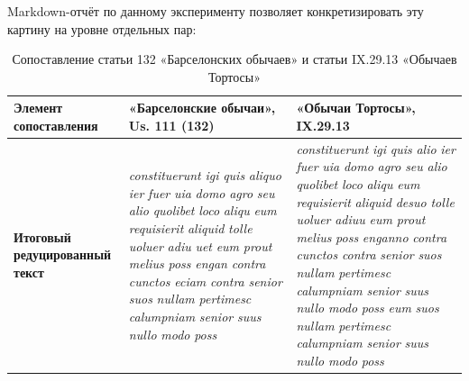Markdown-отчёт по данному эксперименту позволяет конкретизировать эту картину на уровне отдельных пар:

\begin{center}
\small
\setlength{\tabcolsep}{2pt}
\begin{longtable}{|p{}|p{}|p{}|}
\caption{Сопоставление статьи 132 «Барселонских обычаев» и статьи IX.29.13 «Обычаев Тортосы»}\label{tab:ch1-tortosa-132}\\
\hline
\textbf{Элемент сопоставления} & \textbf{«Барселонские обычаи», }\textbf{ }\textbf{Us}\textbf{. }\textbf{111 (}\textbf{132}\textbf{)} & \textbf{«Обычаи Тортосы», IX.29.13} \\ \hline
\textbf{Итоговый редуцированный текст} & \emph{constituerunt}\emph{ }\emph{igi}\emph{ }\emph{quis}\emph{ }\emph{aliquo}\emph{ }\emph{ier}\emph{ }\emph{fuer}\emph{ }\emph{uia}\emph{ }\emph{domo}\emph{ }\emph{agro}\emph{ }\emph{seu}\emph{ }\emph{alio}\emph{ }\emph{quolibet}\emph{ }\emph{loco}\emph{ }\emph{aliqu}\emph{ }\emph{eum}\emph{ }\emph{requisierit}\emph{ }\emph{aliquid}\emph{ }\emph{tolle}\emph{ }\emph{uoluer}\emph{ }\emph{adiu}\emph{ }\emph{uet}\emph{ }\emph{eum}\emph{ }\emph{prout}\emph{ }\emph{melius}\emph{ }\emph{poss}\emph{ }\emph{engan}\emph{ }\emph{contra}\emph{ }\emph{cunctos}\emph{ }\emph{eciam}\emph{ }\emph{contra}\emph{ }\emph{senior}\emph{ }\emph{suos}\emph{ }\emph{nullam}\emph{ }\emph{pertimesc}\emph{ }\emph{calumpniam}\emph{ }\emph{senior}\emph{ }\emph{suus}\emph{ }\emph{nullo}\emph{ }\emph{modo}\emph{ }\emph{poss} & \emph{constituerunt}\emph{ }\emph{igi}\emph{ }\emph{quis}\emph{ }\emph{alio}\emph{ }\emph{ier}\emph{ }\emph{fuer}\emph{ }\emph{uia}\emph{ }\emph{domo}\emph{ }\emph{agro}\emph{ }\emph{seu}\emph{ }\emph{alio}\emph{ }\emph{quolibet}\emph{ }\emph{loco}\emph{ }\emph{aliqu}\emph{ }\emph{eum}\emph{ }\emph{requisierit}\emph{ }\emph{aliquid}\emph{ }\emph{desuo}\emph{ }\emph{tolle}\emph{ }\emph{uoluer}\emph{ }\emph{adiuu}\emph{ }\emph{eum}\emph{ }\emph{prout}\emph{ }\emph{melius}\emph{ }\emph{poss}\emph{ }\emph{enganno}\emph{ }\emph{contra}\emph{ }\emph{cunctos}\emph{ }\emph{contra}\emph{ }\emph{senior}\emph{ }\emph{suos}\emph{ }\emph{nullam}\emph{ }\emph{pertimesc}\emph{ }\emph{calumpniam}\emph{ }\emph{senior}\emph{ }\emph{suus}\emph{ }\emph{nullo}\emph{ }\emph{modo}\emph{ }\emph{poss}\emph{ }\emph{eum}\emph{ }\emph{suos}\emph{ }\emph{nullam}\emph{ }\emph{pertimesc}\emph{ }\emph{calumpniam}\emph{ }\emph{senior}\emph{ }\emph{suus}\emph{ }\emph{nullo}\emph{ }\emph{modo}\emph{ }\emph{poss} \\ \hline

\end{longtable}
\end{center}
